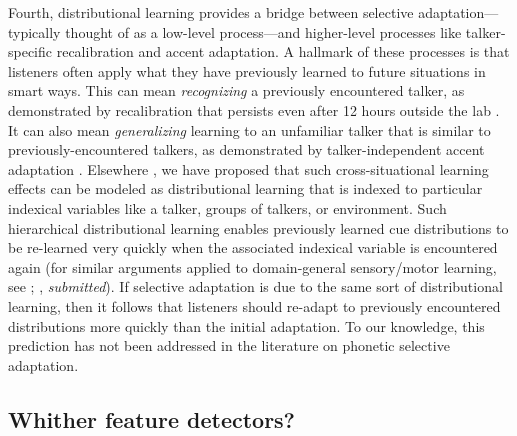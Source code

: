 Fourth, distributional learning provides a bridge between selective adaptation---typically thought of as a low-level process---and higher-level processes like talker-specific recalibration and accent adaptation.  A hallmark of these processes is that listeners often apply what they have previously learned to future situations in smart ways.  This can mean \emph{recognizing} a previously encountered talker, as demonstrated by recalibration that persists even after 12 hours outside the lab \cite{Eisner2006}.  It can also mean \emph{generalizing} learning to an unfamiliar talker that is similar to previously-encountered talkers, as demonstrated by talker-independent accent adaptation \cite{Bradlow2008}.  Elsewhere \cite{Kleinschmidt2015}, we have proposed that such cross-situational learning effects can be modeled as distributional learning that is indexed to particular indexical variables like a talker, groups of talkers, or environment.  Such hierarchical distributional learning enables previously learned cue distributions to be re-learned very quickly when the associated indexical variable is encountered again (for similar arguments applied to domain-general sensory/motor learning, see ; \citeauthor{Qian2013}, \emph{submitted}).  If selective adaptation is due to the same sort of distributional learning, then it follows that listeners should re-adapt to previously encountered distributions more quickly than the initial adaptation.  To our knowledge, this prediction has not been addressed in the literature on phonetic selective adaptation.


\subsection{Whither feature detectors?}
\label{sec:whith-feat-detect}

